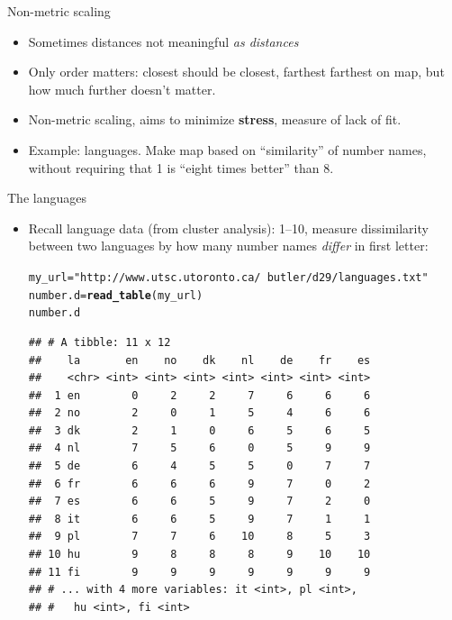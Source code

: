 \documentclass[unknownkeysallowed]{beamer}\usepackage[]{graphicx}\usepackage[]{color}
\makeatletter
\newcommand{\hlstr}[1]{\textcolor[rgb]{0.192,0.494,0.8}{#1}}%
\newcommand{\hlstd}[1]{\textcolor[rgb]{0.345,0.345,0.345}{#1}}%
\newcommand{\hlkwb}[1]{\textcolor[rgb]{0.69,0.353,0.396}{#1}}%
\newcommand{\hlkwd}[1]{\textcolor[rgb]{0.737,0.353,0.396}{\textbf{#1}}}%
\newenvironment{kframe}{%
 \def\at@end@of@kframe{}%
 \ifinner\ifhmode%
  \def\at@end@of@kframe{\end{minipage}}%
  \begin{minipage}{\columnwidth}%
 \fi\fi%
 \def\FrameCommand##1{\hskip\@totalleftmargin \hskip-\fboxsep
 \colorbox{shadecolor}{##1}\hskip-\fboxsep
     \hskip-\linewidth \hskip-\@totalleftmargin \hskip\columnwidth}%
 \MakeFramed {\advance\hsize-\width
   \@totalleftmargin\z@ \linewidth\hsize
   \@setminipage}}%
 {\par\unskip\endMakeFramed%
 \at@end@of@kframe}
\newenvironment{knitrout}{}{} %
\makeatother
\begin{document}
\begin{frame}[fragile]{Non-metric scaling}
  
  \begin{itemize}
  \item Sometimes distances not meaningful \emph{as distances}
  \item Only order matters: closest should be closest, farthest
    farthest on map, but how much further doesn't matter.
  \item Non-metric scaling, aims to minimize \textbf{stress}, measure
    of lack of fit.
  \item Example: languages. Make map based on ``similarity'' of number
    names, without requiring that 1 is ``eight times better'' than 8.
  \end{itemize}
  
\end{frame}

\begin{frame}[fragile]{The languages}

  \begin{itemize}
  \item Recall language data (from cluster analysis): 1--10, measure dissimilarity between two languages by how many number names {\em differ} in first letter:


    
\begin{knitrout}\scriptsize
{}\color{fgcolor}\begin{kframe}
\begin{alltt}
\hlstd{my_url}\hlkwb{=}\hlstr{"http://www.utsc.utoronto.ca/~butler/d29/languages.txt"}
\hlstd{number.d}\hlkwb{=}\hlkwd{read_table}\hlstd{(my_url)}
\hlstd{number.d}
\end{alltt}
\begin{verbatim}
## # A tibble: 11 x 12
##    la       en    no    dk    nl    de    fr    es
##    <chr> <int> <int> <int> <int> <int> <int> <int>
##  1 en        0     2     2     7     6     6     6
##  2 no        2     0     1     5     4     6     6
##  3 dk        2     1     0     6     5     6     5
##  4 nl        7     5     6     0     5     9     9
##  5 de        6     4     5     5     0     7     7
##  6 fr        6     6     6     9     7     0     2
##  7 es        6     6     5     9     7     2     0
##  8 it        6     6     5     9     7     1     1
##  9 pl        7     7     6    10     8     5     3
## 10 hu        9     8     8     8     9    10    10
## 11 fi        9     9     9     9     9     9     9
## # ... with 4 more variables: it <int>, pl <int>,
## #   hu <int>, fi <int>
\end{verbatim}
\end{kframe}
\end{knitrout}




  \end{itemize}
  
\end{frame}
\end{document}
